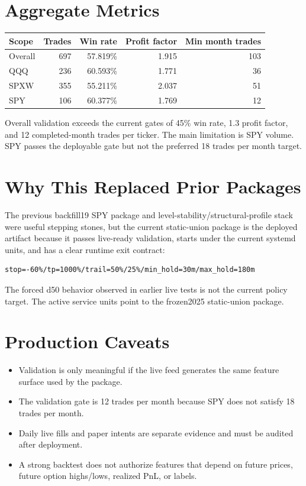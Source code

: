 \documentclass[11pt,a4paper]{article}
\begin{document}
\section{Aggregate Metrics}

\begin{center}
\begin{tabular}{lrrrr}
\toprule
Scope & Trades & Win rate & Profit factor & Min month trades \\
\midrule
Overall & 697 & 57.819\% & 1.915 & 103 \\
QQQ & 236 & 60.593\% & 1.771 & 36 \\
SPXW & 355 & 55.211\% & 2.037 & 51 \\
SPY & 106 & 60.377\% & 1.769 & 12 \\
\bottomrule
\end{tabular}
\end{center}

Overall validation exceeds the current gates of 45\% win rate, 1.3 profit factor, and 12 completed-month trades per ticker. The main limitation is SPY volume. SPY passes the deployable gate but not the preferred 18 trades per month target.

\section{Why This Replaced Prior Packages}

The previous backfill19 SPY package and level-stability/structural-profile stack were useful stepping stones, but the current static-union package is the deployed artifact because it passes live-ready validation, starts under the current systemd units, and has a clear runtime exit contract:

\begin{lstlisting}
stop=-60%/tp=1000%/trail=50%/25%/min_hold=30m/max_hold=180m
\end{lstlisting}

The forced d50 behavior observed in earlier live tests is not the current policy target. The active service units point to the frozen2025 static-union package.

\section{Production Caveats}

\begin{itemize}
  \item Validation is only meaningful if the live feed generates the same feature surface used by the package.
  \item The validation gate is 12 trades per month because SPY does not satisfy 18 trades per month.
  \item Daily live fills and paper intents are separate evidence and must be audited after deployment.
  \item A strong backtest does not authorize features that depend on future prices, future option highs/lows, realized PnL, or labels.
\end{itemize}
\end{document}
